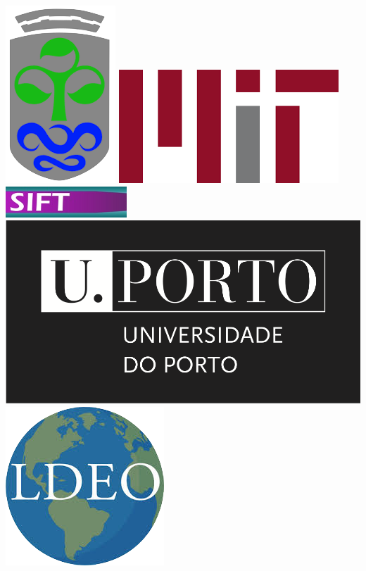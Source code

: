 \begin{titlepage}
\begin{center}
\includegraphics[scale=0.2]{fig/vigo.png}
\hspace{+0.6cm}\includegraphics[scale=0.15]{fig/mit.png}
\hspace{+0.6cm}\includegraphics[scale=0.9]{fig/Sift_logo.png}
\hspace{+0.6cm}\includegraphics[scale=0.25]{fig/uporto.png}
\hspace{+0.6cm}\includegraphics[scale=0.16]{fig/ldeo.png}

\end{center}
\end{titlepage}

